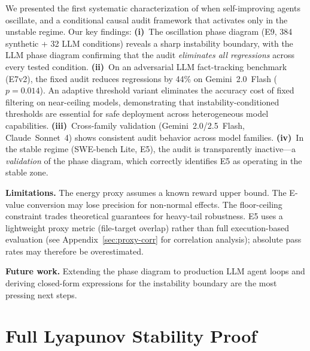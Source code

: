 \documentclass{article}
\begin{document}

We presented the first systematic characterization of when
self-improving agents oscillate, and a conditional causal audit
framework that activates only in the unstable regime. Our key findings:
\textbf{(i)}~The oscillation phase diagram (E9, 384 synthetic + 32 LLM conditions) reveals
a sharp instability boundary, with the LLM phase diagram confirming
that the audit \emph{eliminates all regressions} across every tested condition.
\textbf{(ii)}~On an adversarial LLM fact-tracking benchmark (E7v2),
the fixed audit reduces regressions by 44\% on Gemini~2.0~Flash
($p{=}0.014$). An adaptive threshold variant eliminates the accuracy
cost of fixed filtering on near-ceiling models, demonstrating that
instability-conditioned thresholds are essential for safe deployment
across heterogeneous model capabilities.
\textbf{(iii)}~Cross-family validation (Gemini~2.0/2.5~Flash,
Claude~Sonnet~4) shows consistent audit behavior across model
families.
\textbf{(iv)}~In the stable regime (SWE-bench Lite, E5), the audit
is transparently inactive---a \emph{validation} of the phase diagram,
which correctly identifies E5 as operating in the stable zone.

\textbf{Limitations.}
The energy proxy assumes a known reward upper bound.
The E-value conversion may lose precision for non-normal effects.
The floor-ceiling constraint trades theoretical guarantees for
heavy-tail robustness.
E5 uses a lightweight proxy metric (file-target overlap) rather
than full execution-based evaluation (see
Appendix~\ref{sec:proxy-corr} for correlation analysis);
absolute pass rates may therefore be overestimated.

\textbf{Future work.}
Extending the phase diagram to production LLM agent loops
and deriving closed-form expressions for the instability boundary
are the most pressing next steps.






\appendix

\section{Full Lyapunov Stability Proof}
\label{sec:proof}
\end{document}
